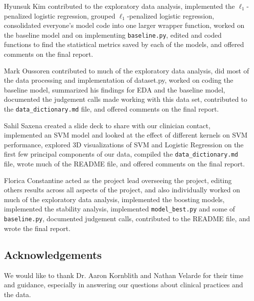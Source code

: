 \documentclass[11pt, letterpaper]{amsart}
\let\Oldsubsection\subsection
\renewcommand{\subsection}{\FloatBarrier\Oldsubsection}
\begin{document}
Hyunsuk Kim contributed to the exploratory data analysis, implemented the $\ell_1$-penalized logistic regression, grouped $\ell_1$-penalized logistic regression, consolidated everyone's model code into one larger wrapper function, worked on the baseline model and on implementing \texttt{baseline.py}, edited and coded functions to find the statistical metrics saved by each of the models, and offered comments on the final report.

Mark Oussoren contributed to much of the exploratory data analysis, did most of the data processing and implementation of dataset.py, worked on coding the baseline model, summarized his findings for EDA and the baseline model, documented the judgement calls made working with this data set, contributed to the \texttt{data\_dictionary.md} file, and offered comments on the final report.

Sahil Saxena created a slide deck to share with our clinician contact, implemented an SVM model and looked at the effect of different kernels on SVM performance, explored 3D visualizations of SVM and Logistic Regression on the first few principal components of our data, compiled the \texttt{data\_dictionary.md} file, wrote much of the README file, and offered comments on the final report.

Florica Constantine acted as the project lead overseeing the project, editing others results across all aspects of the project, and also individually worked on much of the exploratory data analysis, implemented the boosting models, implemented the stability analysis, implemented \texttt{model\_best.py} and some of \texttt{baseline.py}, documented judgement calls, contributed to the README file, and wrote the final report.

\subsection{Acknowledgements}

We would like to thank Dr. Aaron Kornblith and Nathan Velarde for their time and guidance, especially in answering our questions about clinical practices and the data. 

\printbibliography
\end{document}
